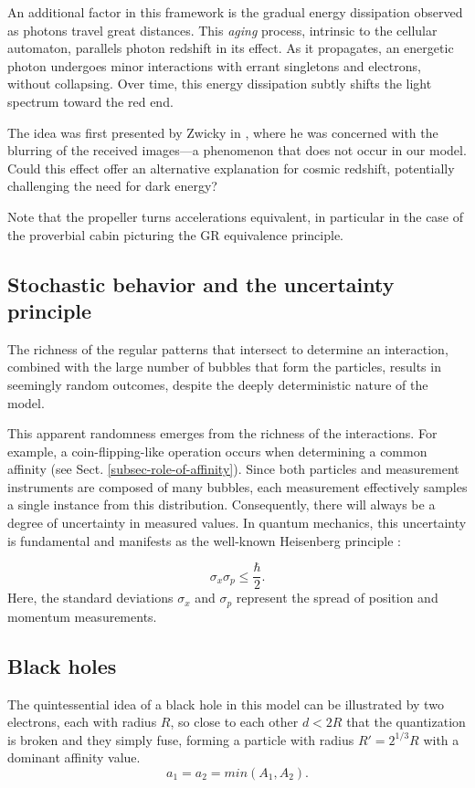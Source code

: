 \documentclass[12pt,english]{article}
\begin{document}
An additional factor in this framework is the gradual energy dissipation observed as photons travel great distances. This \textit{aging} process, intrinsic to the cellular automaton, parallels photon redshift in its effect. As it propagates, an energetic photon undergoes minor interactions with errant singletons and electrons, without collapsing. Over time, this energy dissipation subtly shifts the light spectrum toward the red end.

The idea was first presented by Zwicky in \cite{zwicky1929redshift}, where he was concerned with the blurring of the received images—a phenomenon that does not occur in our model. Could this effect offer an alternative explanation for cosmic redshift, potentially challenging the need for dark energy?

Note that the propeller turns accelerations equivalent, in particular in the case of the proverbial cabin picturing the GR equivalence principle.

\subsection{Stochastic behavior and the uncertainty principle}

The richness of the regular patterns that intersect to determine an interaction, combined with the large number of bubbles that form the particles, results in seemingly random outcomes, despite the deeply deterministic nature of the model.

This apparent randomness emerges from the richness of the interactions. For example, a coin-flipping-like operation occurs when determining a common affinity (see Sect. \ref{subsec-role-of-affinity}). Since both particles and measurement instruments are composed of many bubbles, each measurement effectively samples a single instance from this distribution. Consequently, there will always be a degree of uncertainty in measured values. In quantum mechanics, this uncertainty is fundamental and manifests as the well-known Heisenberg principle \cite{Heisenberg1927}:

\[
\sigma_x \sigma_p \leq \frac{\hbar}{2}.
\]
Here, the standard deviations $\sigma_x$ and $\sigma_p$ represent the spread of position and momentum measurements.

\subsection{Black holes}
The quintessential idea of a black hole in this model can be illustrated by two electrons, each with radius $R$, so close to each other $d<2R$ that the quantization is broken and they simply fuse, forming a particle with radius $R'=2^{1/3}R$ with a dominant affinity value. 
\[
a_1 = a_2 = min(A_1,A_2).
\]
\end{document}
